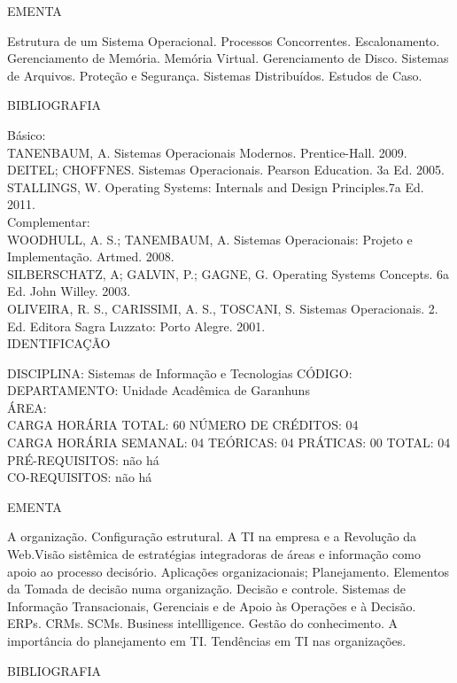 \documentclass[
	12pt,				%
	openright,			%
  oneside,     %
	a4paper,			%
	english,			%
	french,				%
	spanish,			%
	brazil				%
	]{abntex2}
\begin{document}
\begin{apendicesenv}
EMENTA 

Estrutura de um Sistema Operacional. Processos Concorrentes.
Escalonamento. Gerenciamento de Memória. Memória Virtual. Gerenciamento
de Disco. Sistemas de Arquivos. Proteção e Segurança. Sistemas
Distribuídos. Estudos de Caso.

BIBLIOGRAFIA 

Básico:\\
TANENBAUM, A. Sistemas Operacionais Modernos. Prentice-Hall. 2009.\\
DEITEL; CHOFFNES. Sistemas Operacionais. Pearson Education. 3a Ed.
2005.\\
STALLINGS, W. Operating Systems: Internals and Design Principles.7a Ed.
2011.\\
Complementar:\\
WOODHULL, A. S.; TANEMBAUM, A. Sistemas Operacionais: Projeto e
Implementação. Artmed. 2008.\\
SILBERSCHATZ, A; GALVIN, P.; GAGNE, G. Operating Systems Concepts. 6a
Ed. John Willey. 2003.\\
OLIVEIRA, R. S., CARISSIMI, A. S., TOSCANI, S. Sistemas Operacionais. 2.
Ed. Editora Sagra Luzzato: Porto Alegre. 2001.\\


\newpage IDENTIFICAÇÃO

DISCIPLINA: Sistemas de Informação e Tecnologias CÓDIGO:\\ 
DEPARTAMENTO: Unidade Acadêmica de Garanhuns\\
ÁREA:\\
CARGA HORÁRIA TOTAL: 60 NÚMERO DE CRÉDITOS: 04\\
CARGA HORÁRIA SEMANAL: 04 TEÓRICAS: 04 PRÁTICAS: 00 TOTAL: 04\\
PRÉ-REQUISITOS: não há\\
CO-REQUISITOS: não há

EMENTA 

A organização. Configuração estrutural. A TI na empresa e a Revolução da
Web.Visão sistêmica de estratégias integradoras de áreas e informação
como apoio ao processo decisório. Aplicações organizacionais;
Planejamento. Elementos da Tomada de decisão numa organização. Decisão
e controle. Sistemas de Informação Transacionais, Gerenciais e de Apoio
às Operações e à Decisão. ERPs. CRMs. SCMs. Business intellligence.
Gestão do conhecimento. A importância do planejamento em TI. Tendências
em TI nas organizações.

BIBLIOGRAFIA 


\end{apendicesenv}
\end{document}
